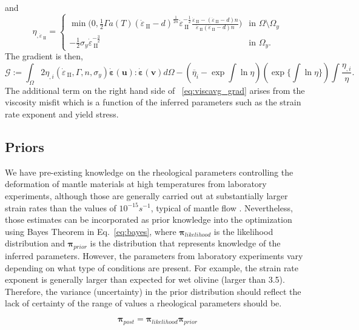 \documentclass[12pt]{article}
\newcommand{\IIinv}{{\dot\varepsilon}_{\mathrm{\!\!\:II}}}
\newcommand{\uu}{{\ensuremath{\boldsymbol{u}}}}
\newcommand{\vv}{{\ensuremath{\boldsymbol{v}}}}
\newcommand{\ppi}{{\ensuremath{\boldsymbol{\pi}}}}
\newcommand{\strain}{{\ensuremath{\dot{\boldsymbol{\varepsilon}}}}}
\begin{document}
and
\begin{equation}
  \eta_{,\IIinv} \!\!=\!\!
  \begin{cases}
   \min\!\Big(0, \frac{1}{2}\Gamma
   a(T)(\IIinv-d)^{\frac{1}{2n}}\IIinv^{-\frac{1}{2}}\frac{\IIinv-(\IIinv-d)n}{\IIinv(\IIinv-d)n}\Big)
   &\text{in } \Omega\setminus\Omega_y 
   \\
   -\frac{1}{2}\sigma_{y}\IIinv^{-\frac{3}{2}}  &\text{in } \Omega_y.
  \end{cases}
\end{equation}
The gradient is then, 
\begin{equation}
\mathcal G:= \int_{\Omega} 2 \eta_{,i}(\IIinv, \Gamma, n, \sigma_y)\strain(\uu):\strain(\vv) d\Omega - (\overline{\eta}_i-\exp\int\ln \eta)(\exp\{\int\ln \eta\})\int\frac{\eta_{,i}}{\eta}.\
\label{eq:viscavg_grad}
\end{equation}
The additional term on the right hand side of ~\eqref{eq:viscavg_grad} arises from the viscosity misfit which is a function of the inferred parameters such as the strain rate exponent and yield stress.


\subsection*{Priors}
 We have pre-existing knowledge on the rheological parameters controlling the deformation of mantle materials at high temperatures from laboratory experiments\cite{ranalli1995rheology}, 
although those are generally carried out at substantially larger strain rates than the values of $10^{-15}s^{-1}$, typical of mantle flow \citep{korenaga2008new}. Nevertheless,  those estimates can be  incorporated as prior knowledge into the optimization using Bayes Theorem in Eq.~\eqref{eq:bayes}, where $\ppi_{likelihood}$ is the likelihood distribution and $\ppi_{prior}$ is the distribution that represents knowledge of the inferred parameters. However, the parameters from laboratory experiments vary depending on what type of conditions are present. For example, the strain rate exponent is generally larger than expected  for wet olivine (larger than 3.5). Therefore, the variance (uncertainty) in the prior distribution should reflect the lack of certainty of the range of values a rheological parameters should be.

\begin{equation}
\ppi_{post} = \ppi_{likelihood}\ppi_{prior}
\label{eq:bayes}
\end{equation}
\end{document}
